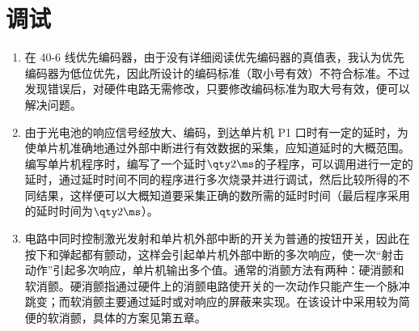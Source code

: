 \section{调试}

\begin{enumerate}
  \item 在 40-6 线优先编码器，由于没有详细阅读优先编码器的真值表，我认为优先编码器为低位优先，因此所设计的编码标准（取小号有效）不符合标准。不过发现错误后，对硬件电路无需修改，只要修改编码标准为取大号有效，便可以解决问题。
  \item 由于光电池的响应信号经放大、编码，到达单片机 P1 口时有一定的延时，为使单片机准确地通过外部中断进行有效数据的采集，应知道延时的大概范围。编写单片机程序时，编写了一个延时$\qty2\ms$的子程序，可以调用进行一定的延时，通过延时时间不同的程序进行多次烧录并进行调试，然后比较所得的不同结果，这样便可以大概知道要采集正确的数所需的延时时间（最后程序采用的延时时间为$\qty2\ms$）。
  \item 电路中同时控制激光发射和单片机外部中断的开关为普通的按钮开关，因此在按下和弹起都有颤动，这样会引起单片机外部中断的多次响应，使一次``射击动作''引起多次响应，单片机输出多个值。通常的消颤方法有两种：硬消颤和软消颤。硬消颤指通过硬件上的消颤电路使开关的一次动作只能产生一个脉冲跳变；而软消颤主要通过延时或对响应的屏蔽来实现。在该设计中采用较为简便的软消颤，具体的方案见第五章。
\end{enumerate}